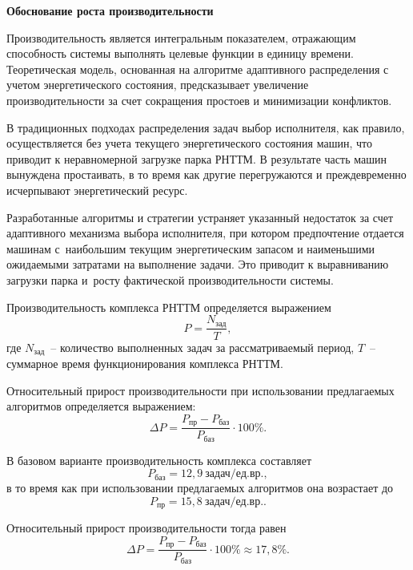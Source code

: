 \textbf{Обоснование роста производительности}

Производительность является интегральным показателем, отражающим способность системы выполнять целевые функции в единицу времени. Теоретическая модель, основанная на алгоритме адаптивного распределения с учетом энергетического состояния, предсказывает увеличение производительности за счет сокращения простоев и минимизации конфликтов.

В традиционных подходах распределения задач выбор исполнителя, как правило, осуществляется без учета текущего энергетического состояния машин, что приводит к неравномерной загрузке парка РНТТМ. В результате часть машин вынуждена простаивать, в то время как другие перегружаются и преждевременно исчерпывают энергетический ресурс.

Разработанные алгоритмы и стратегии устраняет указанный недостаток за счет адаптивного механизма выбора исполнителя, при котором предпочтение отдается машинам с~наибольшим текущим энергетическим запасом и наименьшими ожидаемыми затратами на выполнение задачи. Это приводит к выравниванию загрузки парка и~росту фактической производительности системы.

Производительность комплекса РНТТМ определяется выражением
\begin{equation}
	P = \frac{N_{\text{зад}}}{T},
\end{equation}
где $N_{\text{зад}}$~-- количество выполненных задач за рассматриваемый период, $T$~-- суммарное время функционирования комплекса РНТТМ.

Относительный прирост производительности при использовании предлагаемых алгоритмов определяется выражением:
\begin{equation}
	\Delta P = \frac{P_{\text{пр}} - P_{\text{баз}}}{P_{\text{баз}}} \cdot 100\%.
\end{equation}

В базовом варианте производительность комплекса составляет
\begin{equation}
	P_{\text{баз}} = 12{,}9 \ \text{задач/ед.вр.},
\end{equation}
в то время как при использовании предлагаемых алгоритмов она возрастает до
\begin{equation}
	P_{\text{пр}} = 15{,}8 \ \text{задач/ед.вр.}.
\end{equation}

Относительный прирост производительности тогда равен
\begin{equation}
	\Delta P =
	\frac{P_{\text{пр}} - P_{\text{баз}}}{P_{\text{баз}}} \cdot 100\%
	\approx 17{,}8\%.
\end{equation}

